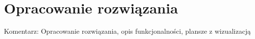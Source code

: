 \chapter{Opracowanie rozwiązania}

Komentarz: Opracowanie rozwiązania, opis funkcjonalności, plansze z wizualizacją